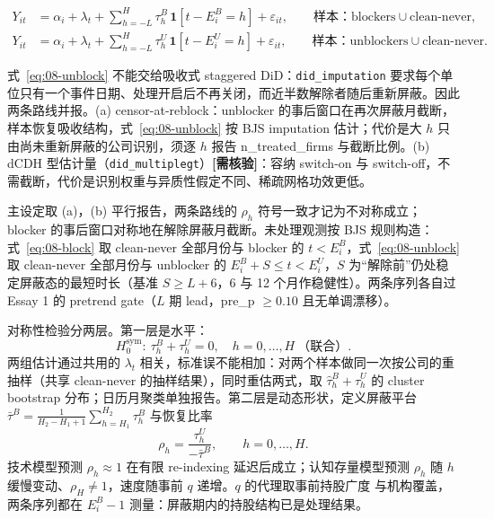 \documentclass[a4paper,11pt]{ctexart}
\begin{document}
\begin{align}
Y_{it} &= \alpha_i + \lambda_t + \sum_{h=-L}^{H} \tau^{B}_h\, \mathbf{1}[t-E^{B}_i = h] + \varepsilon_{it},
\qquad \text{样本：blockers} \cup \text{clean-never}, \label{eq:08-block}\\
Y_{it} &= \alpha_i + \lambda_t + \sum_{h=-L}^{H} \tau^{U}_h\, \mathbf{1}[t-E^{U}_i = h] + \varepsilon_{it},
\qquad \text{样本：unblockers} \cup \text{clean-never}. \label{eq:08-unblock}
\end{align}

式~\eqref{eq:08-unblock} 不能交给吸收式 staggered DiD：\texttt{did\_imputation} 要求每个单位只有一个事件日期、处理开启后不再关闭\citep{borusyakjaravelspiess2024}，而近半数解除者随后重新屏蔽。因此两条路线并报。(a) censor-at-reblock：unblocker 的事后窗口在再次屏蔽月截断，样本恢复吸收结构，式~\eqref{eq:08-unblock} 按 BJS imputation 估计；代价是大 $h$ 只由尚未重新屏蔽的公司识别，须逐 $h$ 报告 n\_treated\_firms 与截断比例。(b) dCDH 型估计量（\texttt{did\_multiplegt}）\textbf{[需核验]}：容纳 switch-on 与 switch-off，不需截断，代价是识别权重与异质性假定不同、稀疏网格功效更低。

主设定取 (a)，(b) 平行报告，两条路线的 $\rho_h$ 符号一致才记为不对称成立；blocker 的事后窗口对称地在解除屏蔽月截断。未处理观测按 BJS 规则构造：式~\eqref{eq:08-block} 取 clean-never 全部月份与 blocker 的 $t<E^{B}_i$，式~\eqref{eq:08-unblock} 取 clean-never 全部月份与 unblocker 的 $E^{B}_i+S\le t<E^{U}_i$，$S$ 为“解除前”仍处稳定屏蔽态的最短时长（基准 $S\ge L+6$，6 与 12 个月作稳健性）。两条序列各自过 Essay 1 的 pretrend gate（$L$ 期 lead，pre\_p $\ge 0.10$ 且无单调漂移）。

对称性检验分两层。第一层是水平：
\begin{equation}
H_0^{\mathrm{sym}}:\ \tau^{B}_h+\tau^{U}_h=0,\quad h=0,\dots,H \ \text{（联合）}. \label{eq:08-equality}
\end{equation}
两组估计通过共用的 $\lambda_t$ 相关，标准误不能相加：对两个样本做同一次按公司的重抽样（共享 clean-never 的抽样结果），同时重估两式，取 $\hat\tau^{B}_h+\hat\tau^{U}_h$ 的 cluster bootstrap 分布；日历月聚类单独报告。第二层是动态形状，定义屏蔽平台 $\bar\tau^{B}=\frac{1}{H_2-H_1+1}\sum_{h=H_1}^{H_2}\tau^{B}_h$ 与恢复比率
\begin{equation}
\rho_h=\frac{\tau^{U}_h}{-\bar\tau^{B}},\qquad h=0,\dots,H. \label{eq:08-recovery}
\end{equation}
技术模型预测 $\rho_h\approx 1$ 在有限 re-indexing 延迟后成立；认知存量模型预测 $\rho_h$ 随 $h$ 缓慢变动、$\rho_H\neq 1$，速度随事前 $q$ 递增。$q$ 的代理取事前持股广度\citep{chenhongstein2002} 与机构覆盖，两条序列都在 $E^{B}_i-1$ 测量：屏蔽期内的持股结构已是处理结果。
\end{document}

